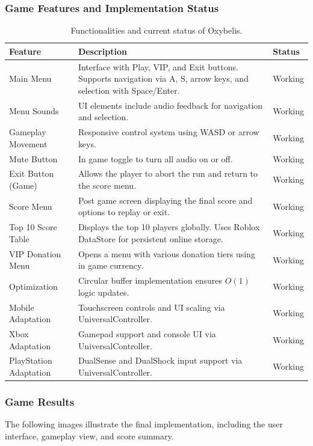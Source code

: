 \documentclass[12pt,letterpaper]{article}
\begin{document}
\subsubsection{Game Features and Implementation Status}

\begin{table}[H]
\centering
\begin{tabular}{|p{4cm}|p{8cm}|p{2.5cm}|}
\hline
\textbf{Feature} & \textbf{Description} & \textbf{Status} \\
\hline
Main Menu & Interface with Play, VIP, and Exit buttons. Supports navigation via A, S, arrow keys, and selection with Space/Enter. & Working \\
\hline
Menu Sounds & UI elements include audio feedback for navigation and selection. & Working \\
\hline
Gameplay Movement & Responsive control system using WASD or arrow keys. & Working \\
\hline
Mute Button & In game toggle to turn all audio on or off. & Working \\
\hline
Exit Button (Game) & Allows the player to abort the run and return to the score menu. & Working \\
\hline
Score Menu & Post game screen displaying the final score and options to replay or exit. & Working \\
\hline
Top 10 Score Table & Displays the top 10 players globally. Uses Roblox DataStore for persistent online storage. & Working \\
\hline
VIP Donation Menu & Opens a menu with various donation tiers using in game currency. & Working \\
\hline
Optimization & Circular buffer implementation ensures $O(1)$ logic updates. & Working \\
\hline
Mobile Adaptation & Touchscreen controls and UI scaling via UniversalController. & Working \\
\hline
Xbox Adaptation & Gamepad support and console UI via UniversalController. & Working \\
\hline
PlayStation Adaptation & DualSense and DualShock input support via UniversalController. & Working \\
\hline
\end{tabular}
\caption{Functionalities and current status of Oxybelis.}
\end{table}

\subsubsection{Game Results}
The following images illustrate the final implementation, including the user interface, gameplay view, and score summary.
\end{document}
